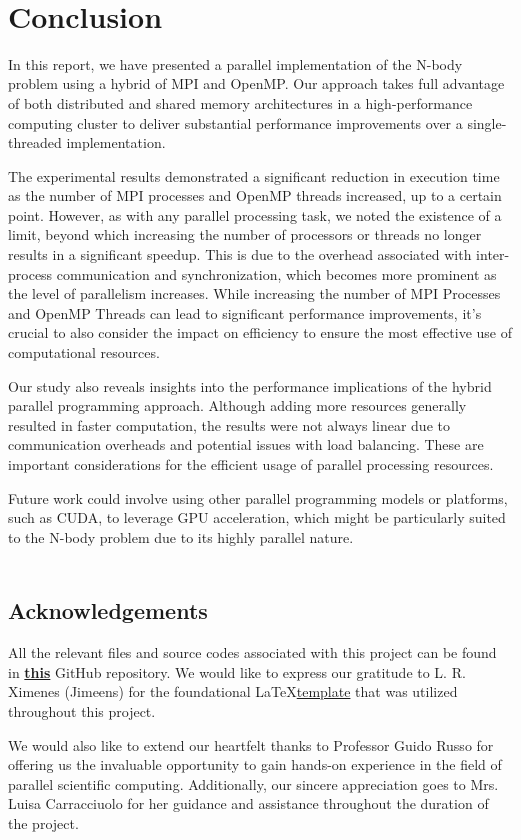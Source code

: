 \documentclass{solutionclass} %
\begin{document}
\divider
\\
\section{Conclusion}
In this report, we have presented a parallel implementation of the N-body problem using a hybrid of MPI and OpenMP. Our approach takes full advantage of both distributed and shared memory architectures in a high-performance computing cluster to deliver substantial performance improvements over a single-threaded implementation.

The experimental results demonstrated a significant reduction in execution time as the number of MPI processes and OpenMP threads increased, up to a certain point. However, as with any parallel processing task, we noted the existence of a limit, beyond which increasing the number of processors or threads no longer results in a significant speedup. This is due to the overhead associated with inter-process communication and synchronization, which becomes more prominent as the level of parallelism increases. While increasing the number of MPI Processes and OpenMP Threads can lead to significant performance improvements, it's crucial to also consider the impact on efficiency to ensure the most effective use of computational resources.

Our study also reveals insights into the performance implications of the hybrid parallel programming approach. Although adding more resources generally resulted in faster computation, the results were not always linear due to communication overheads and potential issues with load balancing. These are important considerations for the efficient usage of parallel processing resources.

Future work could involve using other parallel programming models or platforms, such as CUDA, to leverage GPU acceleration, which might be particularly suited to the N-body problem due to its highly parallel nature. \\

\divider \\

\subsection*{Acknowledgements}

All the relevant files and source codes associated with this project can be found in \textbf{\href{https://github.com/msolki/nparticle_ibisco}{this}} GitHub repository. We would like to express our gratitude to L. R. Ximenes (Jimeens) for the foundational \LaTeX \href{https://www.overleaf.com/latex/templates/a-soft-template-for-homework-solutions/gsbwqcqkyyzt}{template} that was utilized throughout this project.

We would also like to extend our heartfelt thanks to Professor Guido Russo for offering us the invaluable opportunity to gain hands-on experience in the field of parallel scientific computing. Additionally, our sincere appreciation goes to Mrs. Luisa Carracciuolo for her guidance and assistance throughout the duration of the project.
\end{document}
